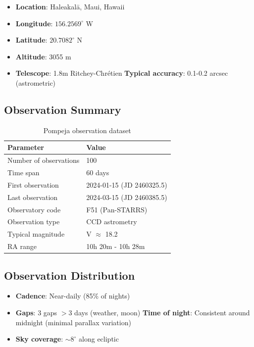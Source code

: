 \begin{itemize}
    \item \textbf{Location}: Haleakalā, Maui, Hawaii
    \item \textbf{Longitude}: $156.2569^\circ$ W
    \item \textbf{Latitude}: $20.7082^\circ$ N
    \item \textbf{Altitude}: 3055 m
    \item \textbf{Telescope}: 1.8m Ritchey-Chrétien
    \textbf{Typical accuracy}: 0.1-0.2 arcsec (astrometric)
\end{itemize}

\subsection{Observation Summary}

\begin{table}[htbp]
\centering
\caption{Pompeja observation dataset}
\begin{tabular}{ll}
\hline
\textbf{Parameter} & \textbf{Value} \\
\hline
Number of observations & 100 \\
Time span & 60 days \\
First observation & 2024-01-15 (JD 2460325.5) \\
Last observation & 2024-03-15 (JD 2460385.5) \\
Observatory code & F51 (Pan-STARRS) \\
Observation type & CCD astrometry \\
Typical magnitude & V $\approx$ 18.2 \\
RA range & 10h 20m - 10h 28m \\
\hline
\end{tabular}
\end{table}

\subsection{Observation Distribution}

\begin{itemize}
    \item \textbf{Cadence}: Near-daily (85\% of nights)
    \item \textbf{Gaps}: 3 gaps $> 3$ days (weather, moon)
    \textbf{Time of night}: Consistent around midnight (minimal parallax variation)
    \item \textbf{Sky coverage}: $\sim 8^\circ$ along ecliptic
\end{itemize}


